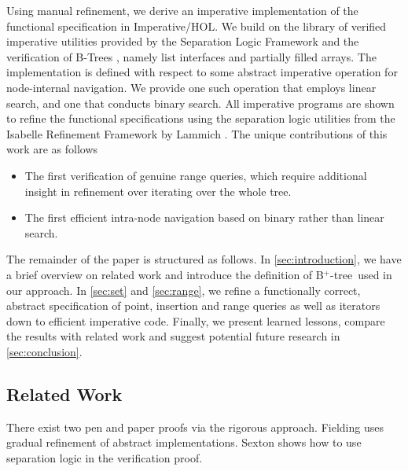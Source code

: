 \documentclass[a4paper,UKenglish,cleveref, autoref, thm-restate]{lipics-v2021}
\newcommand{\btree}{B$^+$-tree}
\begin{document}
Using manual refinement, we derive an imperative implementation of the functional specification
in Imperative/HOL.
We build on the library of verified imperative utilities
provided by the Separation Logic Framework \cite{DBLP:journals/afp/LammichM12}
and the verification of B-Trees \cite{DBLP:journals/afp/Mundler21},
namely list interfaces and partially filled arrays.
The implementation is defined with respect to some abstract imperative
operation for node-internal navigation.
We provide one such operation that employs linear search,
and one that conducts binary search.
All imperative programs are shown to refine the functional specifications
using the separation logic utilities from the Isabelle Refinement Framework by
Lammich \cite{DBLP:journals/jar/Lammich19}. The unique contributions of this work are as follows
\begin{itemize}
   \item The first verification of genuine range queries,
         which require additional insight in refinement over iterating over the whole tree.
   \item The first efficient intra-node navigation based on binary rather than linear search.
\end{itemize}

The remainder of the paper is structured as follows.
In \autoref{sec:introduction}, we have a brief overview on related
work and introduce the definition of \btree\ used in our approach.
In \autoref{sec:set} and \autoref{sec:range},
we refine a functionally correct, abstract specification of
point, insertion and range queries as well as iterators
down to efficient imperative code.
Finally, we present learned lessons, compare the results with related work and suggest potential future
research in \autoref{sec:conclusion}.

\subsection{Related Work}
\label{sec:related_work}

There exist two pen and paper proofs via the rigorous approach.
Fielding \cite{Fielding80} uses gradual refinement of abstract
implementations.
Sexton \cite{DBLP:journals/entcs/SextonT08} shows how to use 
separation logic in the verification proof.
\end{document}
